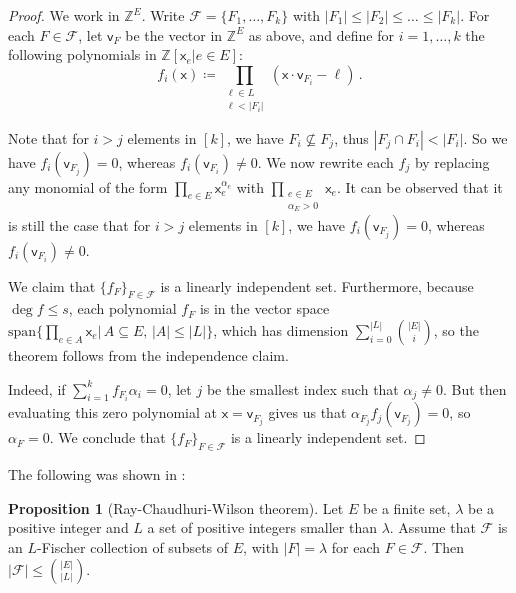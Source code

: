 \documentclass[12pt]{amsart}
\theoremstyle{definition}
\newtheorem{prop}[thm]{Proposition}
\newcommand{\Z}{\mathbb{Z}}
\newcommand{\FF}{\mathcal F}
\newcommand{\vv}{\mathsf{v}}
\newcommand{\vx}{\mathsf{x}}
\newcommand{\spn}{\mathrm{span}}
\begin{document}
\begin{proof}
We work in $\Z^E$.
Write $\FF = \{F_1, \ldots , F_k\}$ with $|F_1| \leq |F_2| \leq \ldots \leq |F_k|$.
For each $F \in \FF$, let $\vv_F$ be the vector in $\Z^E$ as above, and define for $i= 1, \ldots , k$ the following polynomials in $\Z[\vx_e | e \in E]$:
$$f_i(\vx) \coloneqq \prod_{ \substack{\ell \in L \\ \ell < |F_i|}} (\vx \cdot \vv_{F_i} - \ell) \, .$$

Note that for $i > j $ elements in $[k]$, we have $F_i \not\subseteq F_j$, thus $|F_j \cap F_i| <  |F_i|$.
So we have $f_i(\vv_{F_j}) = 0$, whereas $f_i(\vv_{F_i}) \neq 0$.
We now rewrite each $f_j$ by replacing any monomial of the form $\prod_{e\in E}\vx_e^{\alpha_e}$ with $\prod_{\substack{e\in E\\ \alpha_E > 0}}\vx_e$.
It can be observed that it is still the case that for $i > j $ elements in $[k]$, we have $f_i(\vv_{F_j}) = 0$, whereas $f_i(\vv_{F_i}) \neq 0$.

We claim that $\{ f_F \}_{F \in \FF}$ is a linearly independent set.
Furthermore, because $\deg f \leq s$, each polynomial $f_F$ is in the vector space  $\spn\{\prod_{e \in A} \vx_e | \, A \subseteq E, \, |A| \leq |L| \}$, which has dimension $\sum_{i=0}^{|L|} \binom{|E|}{i}$, so the theorem follows from the independence claim.

Indeed, if $\sum_{i = 1}^k f_{F_i} \alpha_i =0$, let $j$ be the smallest index such that $\alpha_j \neq 0$.
But then evaluating this zero polynomial at $\vx = \vv_{F_j} $ gives us that $\alpha_{F_j} f_j(\vv_{F_j}) = 0$, so $\alpha_F = 0$. 
We conclude that $\{ f_F \}_{F \in \FF}$ is a linearly independent set.
\end{proof}

The following was shown in \cite{ray1975t}:

\begin{prop}[Ray-Chaudhuri-Wilson theorem]\label{prop:RCW}
Let $E$ be a finite set, $\lambda $ be a positive integer and $L$ a set of positive integers smaller than $\lambda$.
Assume that $\FF $ is an $L$-Fischer collection of subsets of $E$, with $|F| = \lambda $ for each $F \in \FF$.
Then $|\FF| \leq \binom{|E|}{|L|}$.
\end{prop}
\end{document}
